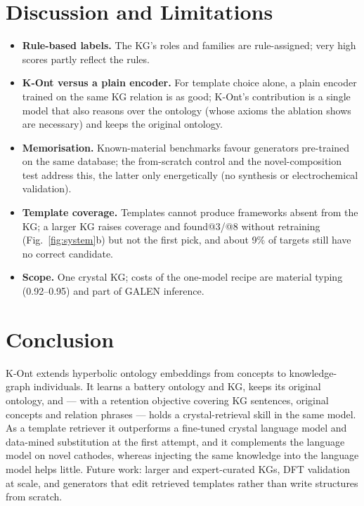 \documentclass[conference]{IEEEtran}
\begin{document}
\section{Discussion and Limitations}
\begin{itemize}
\item \textbf{Rule-based labels.} The KG's roles and families are rule-assigned; very high scores partly reflect the rules.
\item \textbf{K-Ont versus a plain encoder.} For template choice alone, a plain encoder trained on the same KG relation is as good; K-Ont's contribution is a single model that also reasons over the ontology (whose axioms the ablation shows are necessary) and keeps the original ontology.
\item \textbf{Memorisation.} Known-material benchmarks favour generators pre-trained on the same database; the from-scratch control and the novel-composition test address this, the latter only energetically (no synthesis or electrochemical validation).
\item \textbf{Template coverage.} Templates cannot produce frameworks absent from the KG; a larger KG raises coverage and found@3/@8 without retraining (Fig.~\ref{fig:system}b) but not the first pick, and about 9\% of targets still have no correct candidate.
\item \textbf{Scope.} One crystal KG; costs of the one-model recipe are material typing (0.92--0.95) and part of GALEN inference.
\end{itemize}
\section{Conclusion}
K-Ont extends hyperbolic ontology embeddings from concepts to knowledge-graph individuals. It learns a battery ontology and KG, keeps its original ontology, and --- with a retention objective covering KG sentences, original concepts and relation phrases --- holds a crystal-retrieval skill in the same model. As a template retriever it outperforms a fine-tuned crystal language model and data-mined substitution at the first attempt, and it complements the language model on novel cathodes, whereas injecting the same knowledge into the language model helps little. Future work: larger and expert-curated KGs, DFT validation at scale, and generators that edit retrieved templates rather than write structures from scratch.



\end{document}
